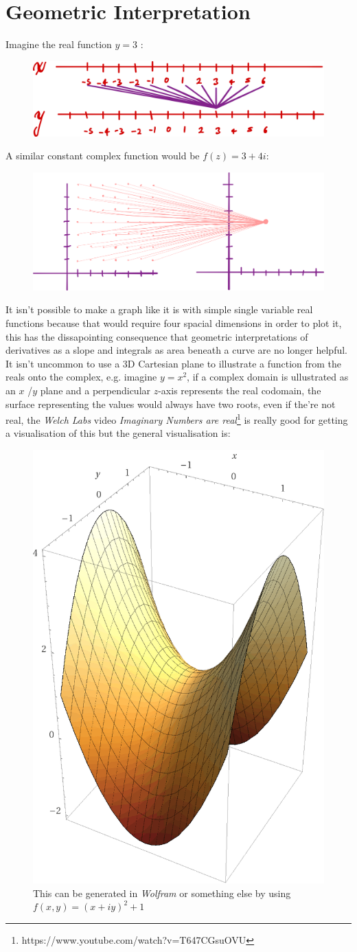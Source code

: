 \documentclass[class=article, crop=false]{standalone}
\begin{document}
\newpage
\section{Geometric Interpretation}
Imagine the real function $y = 3$ :
\begin{figure}[!h]
	\centering
	\includegraphics[width=0.7\linewidth]{"./media/ComplexFunctions/PNG image.png"}
	\caption{}
	\label{fig:png-image}
\end{figure}

A similar constant complex function would be $f\left( z \right) =  3 +  4i$:
\begin{figure}[h!]
	\centering
	\includegraphics[width=0.7\linewidth]{"./media/ComplexFunctions/PNG image 2.png"}
	\caption{}
	\label{fig:png-image-2}
\end{figure}

It isn't possible to make a graph like it is with simple single variable real functions because that would require four spacial dimensions in order to plot it, this has the dissapointing consequence that geometric interpretations of derivatives as a slope and integrals as area beneath a curve are no longer helpful. \\

It isn't uncommon to use a 3D Cartesian plane to illustrate a function from the reals onto the complex, e.g. imagine $ y =  x^{2}$, if a complex domain is ullustrated as an $x$ /$y$ plane and a perpendicular $z$-axis represents the real codomain, the surface representing the values would always have two roots, even if the're not real, the \textit{Welch Labs} video \textit{Imaginary Numbers are real}\footnote{https://www.youtube.com/watch?v=T647CGsuOVU} is really good for getting a visualisation of this but the general visualisation is:


\begin{figure}[h!]
	\centering
	\includegraphics[width=0.2\linewidth]{"./media/ComplexFunctions/PNG image 3.png"}
        \caption{This can be generated in \textit{Wolfram} or something else by using $f(x,y) = \left( x +  i y \right)^2 +  1$}
	\label{fig:png-image-3}
\end{figure}
\end{document}
